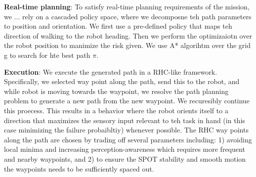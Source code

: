 \documentclass[letterpaper, 10pt, conference]{ieeeconf}      %
\newcommand{\ph}[1]{{\textbf{#1}:}} %
\begin{document}
\ph{Real-time planning}
To satisfy real-time planning requirements of the mission, we ... rely on a cascaded policy space, where we decomposne teh path parameters to position and orientation. We first use a pre-defined policy that maps teh direction of walking to the robot heading. Then we perform the optimizaiotn over the robot position to manimize the risk given. We use A* algorihtm over the grid g to search for hte best path $\pi$.  

\ph{Execution}
We execute the generated path in a RHC-like framework. Specifically, we selected way point along the path, send this to the robot, and while robot is moving towards the waypoint, we resolve the path planning problem to generate a new path from the new waypoint. We recuresibly  continue this proecess. This results in a behavior where the robot orients itself to a direction that maximizes the sensory input relevant to teh task in hand (in this case minimizing the failure probaibltiy) whenever possible. The RHC way points along the path are chosen by trading off several parameters including: 1) avoiding local minima and increasing perception-awareness which requires more frequent and nearby waypoints, and 2) to ensure the SPOT stability and smooth motion the waypoints needs to be sufficiently spaced out.




\end{document}
